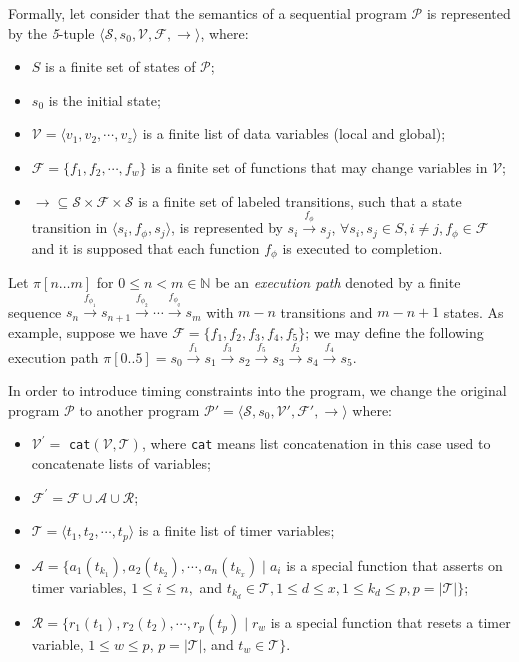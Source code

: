 \documentclass{llncs}
\begin{document}
Formally,
let consider that the semantics of a sequential program $\mathcal{P}$ is represented by the {\it 5}-tuple 
$\langle \mathcal{S}, s_0, \mathcal{V}, \mathcal{F}, \rightarrow \rangle$, 
where:
\begin{itemize}
\item $S$ is a finite set of states of $\mathcal{P}$;
\item $s_0$ is the initial state;
\item $\mathcal{V} = \langle v_1, v_2, \cdots, v_z\rangle$ is a finite list of data variables (local and global);
\item $\mathcal{F} = \{f_1, f_2, \cdots, f_w\}$ is a finite set of functions that may change variables
in $\mathcal{V}$; 
\item $\rightarrow \subseteq \mathcal{S} \times \mathcal{F} \times \mathcal{S}$ is a finite set of labeled transitions,
such that a state transition in $\langle s_i, f_{\phi}, s_j\rangle$, 
is represented by 
$s_i \stackrel{f_{\phi}} \longrightarrow s_j$, $\forall s_i,s_j \in S, i \neq j, f_{\phi} \in \mathcal{F}$ and 
it is supposed that each function $f_{\phi}$ is executed to completion.
\end{itemize}



Let $\pi[n \ldots m]$ for $0 \leq n < m \in \mathbb{N}$ be an {\it execution path} denoted by a finite sequence 
$s_n \stackrel{f_{\phi_{1}}} \longrightarrow s_{n+1} \stackrel{f_{\phi_{2}}}  \longrightarrow \cdots
\stackrel{f_{\phi_{q}}} \longrightarrow s_{m}$
with $m-n$ transitions and $m - n + 1$ states. 
As example, suppose we have
$\mathcal{F} = \{f_1, f_2, f_3, f_4, f_5\}$;
we may define the following execution path
$\pi [0..5]= s_0 \stackrel{f_1} \longrightarrow s_1 \stackrel{f_3} \longrightarrow 
s_2 \stackrel{f_5} \longrightarrow s_3 \stackrel{f_2} \longrightarrow
s_4 \stackrel{f_4} \longrightarrow s_5$.


In order to introduce timing constraints into the program, we change the original 
program $\mathcal{P}$ to another program $\mathcal{P'} = 
\langle \mathcal{S}, s_0, \mathcal{V'}, \mathcal{F'}, \rightarrow \rangle$ 
where:
\begin{itemize}
\item $\mathcal{V^{'}} = $ {\tt cat}$(\mathcal{V}, \mathcal{T})$, where {\tt cat} means list concatenation
 in this case used to concatenate lists of variables;
\item $\mathcal{F^{'}} = \mathcal{F}  \cup \mathcal{A}  \cup \mathcal{R}$;
\item $\mathcal{T} = \langle t_1, t_2, \cdots, t_p \rangle$ is a finite list of timer variables;
\item $\mathcal{A} = \{ a_1(t_{k_1}), a_2(t_{k_2}), \cdots, a_n(t_{k_x}) \; |  \;
a_i$ is a special function that asserts on timer variables, $1 \leq i \leq n,$ and
 $t_{k_d} \in \mathcal{T}, 1 \leq d \leq x, 1 \leq k_d \leq p, p = | \mathcal{T} | \}$;  
\item $\mathcal{R} = \{ r_1(t_{1}), r_2(t_{2}), \cdots, r_p(t_{p}) \; |  \;
r_w$ is a special function that resets a timer variable, $1 \leq w \leq p$, $p = | \mathcal{T} |$, and $t_w \in \mathcal{T}\}$.
\end{itemize}
\end{document}
